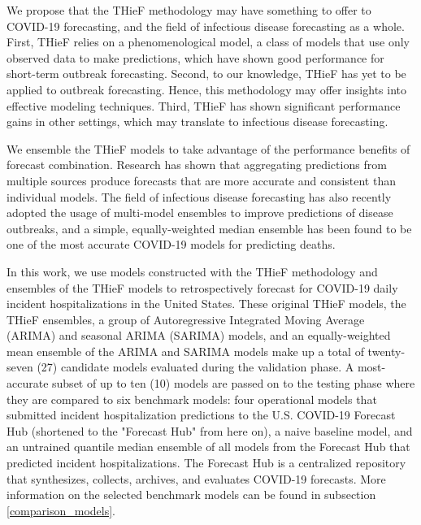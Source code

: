 \documentclass[12pt]{article}
\begin{document}
We propose that the THieF methodology may have something to offer to COVID-19 forecasting, and the field of infectious disease forecasting as a whole. First, THieF relies on a phenomenological model, a class of models that use only observed data to make predictions, which have shown good performance for short-term outbreak forecasting\cite{lauer}. Second, to our knowledge, THieF has yet to be applied to outbreak forecasting. Hence, this methodology may offer insights into effective modeling techniques. Third, THieF has shown significant performance gains in other settings, which may translate to infectious disease forecasting\cite{cramer, thief}.

We ensemble the THieF models to take advantage of the performance benefits of forecast combination. Research has shown that aggregating predictions from multiple sources produce forecasts that are more accurate and consistent than individual models\cite{clemen1989, timmermann2006, hibon2005}. The field of infectious disease forecasting has also recently adopted the usage of multi-model ensembles to improve predictions of disease outbreaks, and a simple, equally-weighted median ensemble has been found to be one of the most accurate COVID-19 models for predicting deaths\cite{mcgowan2019, cramer}. %

In this work, we use models constructed with the THieF methodology and ensembles of the THieF models to retrospectively forecast for COVID-19 daily incident hospitalizations in the United States. These original THieF models, the THieF ensembles, a group of Autoregressive Integrated Moving Average (ARIMA) and seasonal ARIMA (SARIMA) models, and an equally-weighted mean ensemble of the ARIMA and SARIMA models make up a total of twenty-seven (27) candidate models evaluated during the validation phase. A most-accurate subset of up to ten (10) models are passed on to the testing phase where they are compared to six benchmark models: four operational models that submitted incident hospitalization predictions to the U.S. COVID-19 Forecast Hub (shortened to the "Forecast Hub" from here on), a naive baseline model, and an untrained quantile median ensemble of all models from the Forecast Hub that predicted incident hospitalizations. The Forecast Hub is a centralized repository that synthesizes, collects, archives, and evaluates COVID-19 forecasts\cite{hub_data_repo}. More information on the selected benchmark models can be found in subsection \ref{comparison_models}.
\end{document}
